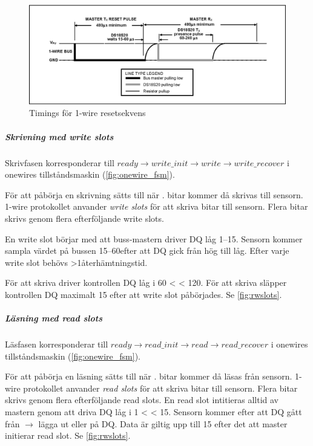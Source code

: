 \documentclass[a4paper]{scrreprt}
\begin{document}
\begin{figure}[H]
	\centering
	\includegraphics[width=\textwidth]{reset_presence.eps}
	\caption{Timings för 1-wire resetsekvens}
	\label{fig:ow_timings}
\end{figure}


\subparagraph{Skrivning med \emph{write slots}}
Skrivfasen korresponderar till $ready\rightarrow write\_init\rightarrow write\rightarrow write\_recover$ i onewires tillståndsmaskin (\autoref{fig:onewire_fsm}).

För att påbörja en skrivning sätts  till  när .
 bitar kommer då skrivas till sensorn.
1-wire protokollet anvander \emph{write slots} för att skriva bitar till sensorn. Flera bitar skrivs genom flera efterföljande write slots.

En write slot börjar med att buss-mastern driver DQ låg 1--15\us. Sensorn kommer sampla värdet på bussen 15--60\us efter att DQ gick från hög till låg. Efter varje write slot behövs >1\us återhämtningstid.

För att skriva \low{} driver kontrollen DQ låg i 60\us{} < \Tx{} < 120\us{}.
För att skriva \high{} släpper kontrollen DQ maximalt 15\us{} efter att write slot påbörjades.
Se \autoref{fig:rwslots}.


\subparagraph{Läsning med \emph{read slots}}
Läsfasen korresponderar till $ready\rightarrow read\_init\rightarrow read\rightarrow read\_recover$ i onewires tillståndsmaskin (\autoref{fig:onewire_fsm}).

För att påbörja en läsning sätts  till  när .
 bitar kommer då läsas från sensorn.
1-wire protokollet anvander \emph{read slots} för att skriva bitar till sensorn. Flera bitar skrivs genom flera efterföljande read slots.
En read slot intitieras alltid av mastern genom att driva DQ låg i 1\us{} < \Tx{} < 15\us{}. Sensorn kommer efter att DQ gått från \high{} $\rightarrow$ \low{} lägga ut \high{} eller \low{} på DQ. Data är giltig upp till 15\us{} efter det att master initierar read slot.
Se \autoref{fig:rwslots}.
\end{document}
